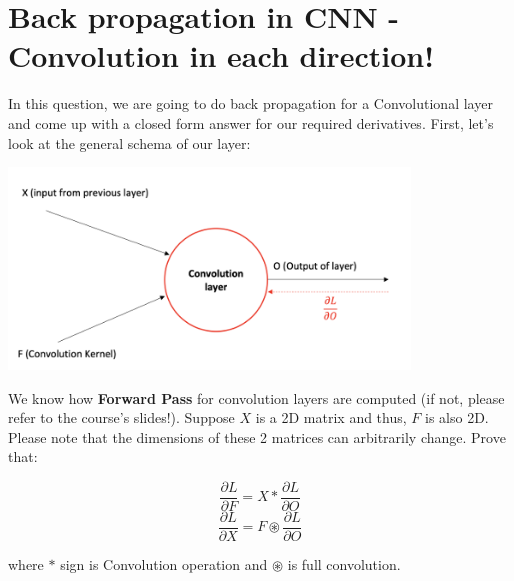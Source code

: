 \section{Back propagation in CNN - Convolution in each direction!}

In this question, we are going to do back propagation for a Convolutional layer and come up with a closed form answer for our required derivatives. First, let's look at the general schema of our layer:

\begin{center}
\includegraphics[width = 0.8\textwidth]{convolution_layer_diagram.png} %
\end{center}

We know how \textbf{Forward Pass} for convolution layers are computed (if not, please refer to the course's slides!). Suppose \( X \) is a 2D matrix and thus, \( F \) is also 2D. Please note that the dimensions of these 2 matrices can arbitrarily change. Prove that:

$$\frac{\partial L}{\partial F} = X * \frac{\partial L}{\partial O}$$
$$\frac{\partial L}{\partial X} = F \circledast \frac{\partial L}{\partial O}$$

where \( * \) sign is Convolution operation and \( \circledast \) is full convolution.

